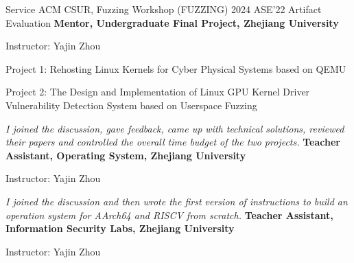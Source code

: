 \begin{rubric}{Service}
\entry*[2024] 
        ACM CSUR, Fuzzing Workshop (FUZZING) 2024
\entry*[2022] 
    ASE'22 Artifact Evaluation 
\entry*[2020.09 -- 2021.06] 
    \textbf{Mentor, Undergraduate Final Project, Zhejiang University}
    \par Instructor: Yajin Zhou
    \par {Project 1: Rehosting Linux Kernels for Cyber Physical Systems based on QEMU}
    \par {Project 2: The Design and Implementation of Linux GPU Kernel Driver Vulnerability Detection System based on Userspace Fuzzing}
    \par \emph{I joined the discussion,  gave feedback, came up with technical solutions,
    reviewed their papers and controlled the overall time budget of the two projects.}
\entry*[2019.09 -- 2020.01] 
    \textbf{Teacher Assistant, Operating System, Zhejiang University}
    \par Instructor: Yajin Zhou
    \par \emph{I joined the discussion and then wrote the first version 
    of instructions to build an operation system for AArch64 and RISCV from scratch.}
\entry*[2019.03 -- 2019.06] 
    \textbf{Teacher Assistant, Information Security Labs, Zhejiang University}
    \par Instructor: Yajin Zhou
\end{rubric}
